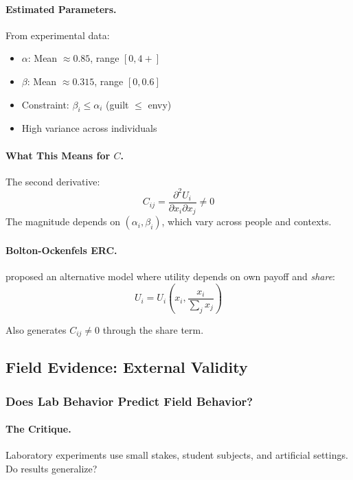 \paragraph{Estimated Parameters.}
From experimental data:
\begin{itemize}
  \item $\alpha$: Mean $\approx 0.85$, range $[0, 4+]$
  \item $\beta$: Mean $\approx 0.315$, range $[0, 0.6]$
  \item Constraint: $\beta_i \leq \alpha_i$ (guilt $\leq$ envy)
  \item High variance across individuals
\end{itemize}

\paragraph{What This Means for $C$.}
The second derivative:
\begin{equation}
  C_{ij} = \frac{\partial^2 U_i}{\partial x_i \partial x_j} \neq 0
\end{equation}
The magnitude depends on $(\alpha_i, \beta_i)$, which vary across people and contexts.

\paragraph{Bolton-Ockenfels ERC.}
\citet{boltonockenfels} proposed an alternative model where utility depends on own payoff and \emph{share}:
\begin{equation}
  U_i = U_i\left(x_i, \frac{x_i}{\sum_j x_j}\right)
\end{equation}

Also generates $C_{ij} \neq 0$ through the share term.

\subsection{Field Evidence: External Validity}

\subsubsection{Does Lab Behavior Predict Field Behavior?}

\paragraph{The Critique.}
Laboratory experiments use small stakes, student subjects, and artificial settings.
Do results generalize?

